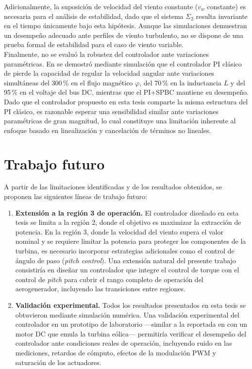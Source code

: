 Adicionalmente, la suposición de velocidad del viento constante ($v_w$ 
constante) es necesaria para el análisis de estabilidad, dado que el sistema 
$\Sigma_2$ resulta invariante en el tiempo únicamente bajo esta hipótesis. 
Aunque las simulaciones demuestran un desempeño adecuado ante perfiles de 
viento turbulento, no se dispone de una prueba formal de estabilidad para el 
caso de viento variable.
\\

Finalmente, no se evaluó la robustez del controlador ante variaciones 
paramétricas. En \cite{cisneros2020} se demostró mediante simulación que el 
controlador PI clásico de \cite{chinchilla2006} pierde la capacidad de regular 
la velocidad angular ante variaciones simultáneas del 300\,\% en el flujo 
magnético $\varphi$, del 70\,\% en la inductancia $L$ y del 95\,\% en el 
voltaje del bus DC, mientras que el PI+SPBC mantiene su desempeño. Dado que el 
controlador propuesto en esta tesis comparte la misma estructura del PI clásico, 
es razonable esperar una sensibilidad similar ante variaciones paramétricas de 
gran magnitud, lo cual constituye una limitación inherente al enfoque basado en 
linealización y cancelación de términos no lineales.

\section{Trabajo futuro}

A partir de las limitaciones identificadas y de los resultados obtenidos, se 
proponen las siguientes líneas de trabajo futuro:
\\

\begin{enumerate}
    \item \textbf{Extensión a la región 3 de operación.} El controlador diseñado 
    en esta tesis se limita a la región 2, donde el objetivo es maximizar la 
    extracción de potencia. En la región 3, donde la velocidad del viento supera 
    el valor nominal y se requiere limitar la potencia para proteger los 
    componentes de la turbina, es necesario incorporar estrategias adicionales 
    como el control de ángulo de paso (\textit{pitch control}). Una extensión 
    natural del presente trabajo consistiría en diseñar un controlador que 
    integre el control de torque con el control de \textit{pitch} para cubrir 
    el rango completo de operación del aerogenerador, incluyendo las 
    transiciones entre regiones.

    \item \textbf{Validación experimental.} Todos los resultados presentados en 
    esta tesis se obtuvieron mediante simulación numérica. Una validación 
    experimental del controlador en un prototipo de laboratorio ---similar a la 
    reportada en \cite{chinchilla2006} con un motor DC que emula la turbina 
    eólica--- permitiría verificar el desempeño del controlador ante condiciones 
    reales de operación, incluyendo ruido en las mediciones, retardos de 
    cómputo, efectos de la modulación PWM y saturación de los actuadores.
\end{enumerate}
